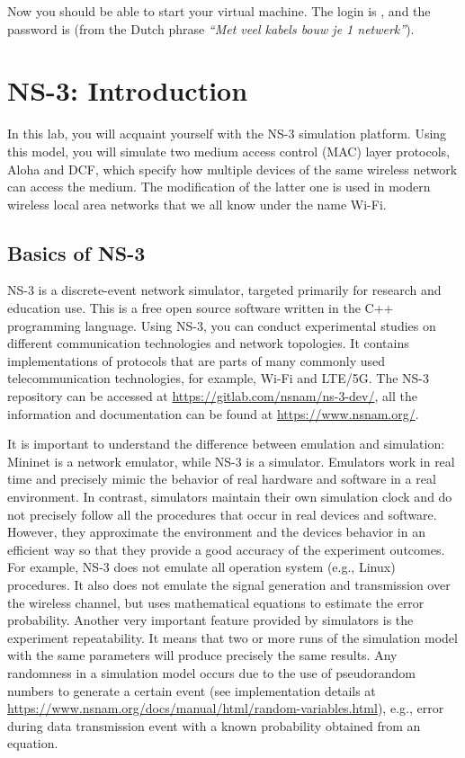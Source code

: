 Now you should be able to start your virtual machine. The login is , and the password is  (from the Dutch phrase \emph{``Met veel kabels bouw je 1 netwerk''}).

\newpage
\section{NS-3: Introduction}\label{sec:lab0}
In this lab, you will acquaint yourself with the NS-3 simulation platform. Using this model, you will simulate two medium access control (MAC) layer protocols, Aloha and DCF, which specify how multiple devices of the same wireless network can access the medium. The modification of the latter one is used in modern wireless local area networks that we all know under the name Wi-Fi. 

\subsection{Basics of NS-3}
NS-3 is a discrete-event network simulator, targeted primarily for research and education use. This is a free open source software written in the C++ programming language. Using NS-3, you can conduct experimental studies on different communication technologies and network topologies. It contains implementations of protocols that are parts of many commonly used telecommunication technologies, for example, Wi-Fi and LTE/5G. The NS-3 repository can be accessed at \url{https://gitlab.com/nsnam/ns-3-dev/}, all the information and documentation can be found at \url{https://www.nsnam.org/}.

It is important to understand the difference between emulation and simulation: Mininet is a network emulator, while NS-3 is a simulator. Emulators work in real time and precisely mimic the behavior of real hardware and software in a real environment. In contrast, simulators maintain their own simulation clock and do not precisely follow all the procedures that occur in real devices and software. However, they approximate the environment and the devices behavior in an efficient way so that they provide a good accuracy of the experiment outcomes. For example, NS-3 does not emulate all operation system (e.g., Linux) procedures. It also does not emulate the signal generation and transmission over the wireless channel, but uses mathematical equations to estimate the error probability. Another very important feature provided by simulators is the experiment repeatability. It means that two or more runs of the simulation model with the same parameters will produce precisely the same results. Any randomness in a simulation model occurs due to the use of pseudorandom numbers to generate a certain event (see implementation details at \url{https://www.nsnam.org/docs/manual/html/random-variables.html}), e.g., error during data transmission event with a known probability obtained from an equation.

